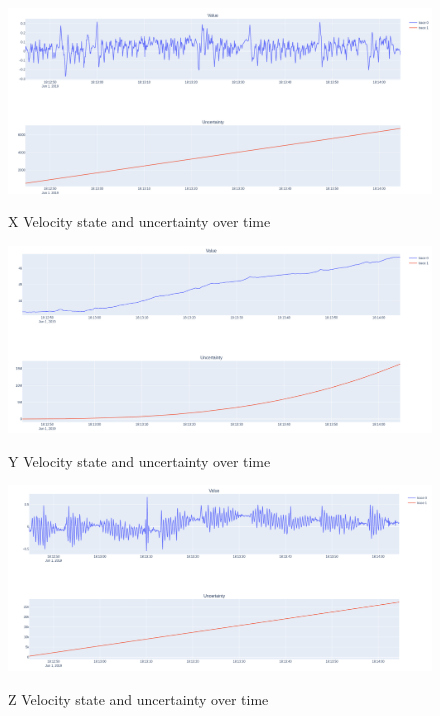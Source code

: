 \documentclass[12pt]{article}
\begin{document}
\begin{figure}[H]
    \centering
    \includegraphics[width=\linewidth]{figures/vx_uncertainty.png}\\
    \caption{X Velocity state and uncertainty over time}
    \label{fig:vx}
\end{figure}
\begin{figure}[H]
    \centering
    \includegraphics[width=\linewidth]{figures/vy_uncertainty.png}\\
    \caption{Y Velocity state and uncertainty over time}
    \label{fig:vy}
\end{figure}
\begin{figure}[H]
    \centering
    \includegraphics[width=\linewidth]{figures/vz_uncertainty.png}\\
    \caption{Z Velocity state and uncertainty over time}
    \label{fig:vz}
\end{figure}
\end{document}
